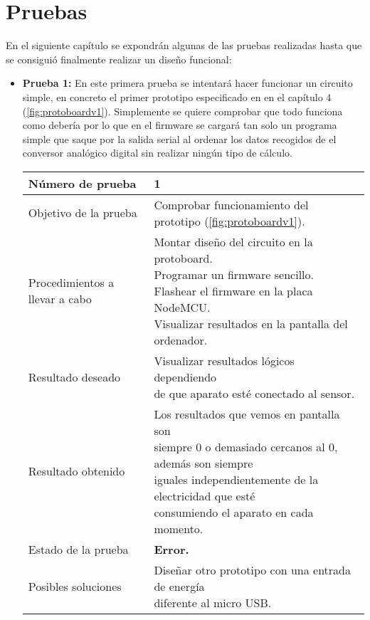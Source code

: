 \chapter{Pruebas}
En el siguiente capítulo se expondrán algunas de las pruebas realizadas hasta que se consiguió finalmente realizar un diseño funcional:

\begin{itemize}
	\item \textbf{Prueba 1:} En este primera prueba se intentará hacer funcionar un circuito simple, en concreto el primer prototipo especificado en en el capítulo 4 (\ref{fig:protoboardv1}). Simplemente se quiere comprobar que todo funciona como debería por lo que en el firmware se cargará tan solo un programa simple que saque por la salida serial al ordenar los datos recogidos de el conversor analógico digital sin realizar ningún tipo de cálculo.
	
	\begin{table}[H]
		\begin{center}
			\begin{tabular}{|l|l|}
				\hline
				Número de prueba &  1 \\ \hline 
				Objetivo de la prueba &  Comprobar funcionamiento del prototipo (\ref{fig:protoboardv1}).\\ \hline 
				Procedimientos a llevar a cabo &  \makecell[l]{\tabitem Montar diseño del circuito en la protoboard. \\ \tabitem Programar un firmware sencillo.
				\\ \tabitem Flashear el firmware en la placa NodeMCU.
				\\ \tabitem Visualizar resultados en la pantalla del ordenador.}
				 \\ \hline 
				Resultado deseado &  \makecell[l]{Visualizar resultados lógicos dependiendo \\ de que aparato esté conectado al sensor.} \\ \hline 
				Resultado obtenido &  \makecell[l]{Los resultados que vemos en pantalla son \\ siempre 0 o demasiado cercanos al 0, además son siempre \\ iguales independientemente de la electricidad que esté \\ consumiendo el aparato en cada momento.} \\ \hline  
				Estado de la prueba &  \textbf{Error.} \\ \hline 
				Posibles soluciones &  \makecell[l]{Diseñar otro prototipo con una entrada de energía \\diferente al micro USB. } \\ \hline 


\end{tabular}
\end{center}
\end{table}
\end{itemize}
